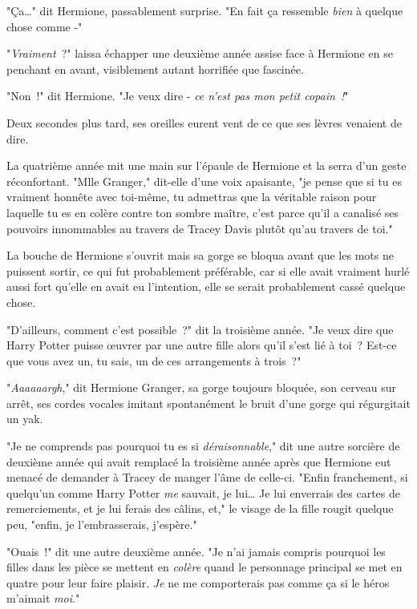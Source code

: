 "Ça…" dit Hermione, passablement surprise. "En fait ça ressemble \emph{bien} à quelque chose comme -"

"\emph{Vraiment}~?" laissa échapper une deuxième année assise face à Hermione en se penchant en avant, visiblement autant horrifiée que fascinée.

"Non~!" dit Hermione. "Je veux dire - \emph{ce n'est pas mon petit copain~!}"

Deux secondes plus tard, ses oreilles eurent vent de ce que ses lèvres venaient de dire.

La quatrième année mit une main sur l'épaule de Hermione et la serra d'un geste réconfortant. "Mlle Granger," dit-elle d'une voix apaisante, "je pense que si tu es vraiment honnête avec toi-même, tu admettras que la véritable raison pour laquelle tu es en colère contre ton sombre maître, c'est parce qu'il a canalisé ses pouvoirs innommables au travers de Tracey Davis plutôt qu'au travers de toi."

La bouche de Hermione s'ouvrit mais sa gorge se bloqua avant que les mots ne puissent sortir, ce qui fut probablement préférable, car si elle avait vraiment hurlé aussi fort qu'elle en avait eu l'intention, elle se serait probablement cassé quelque chose.

"D'ailleurs, comment c'est possible~?" dit la troisième année. "Je veux dire que Harry Potter puisse œuvrer par une autre fille alors qu'il s'est lié à toi~? Est-ce que vous avez un, tu sais, un de ces arrangements à trois~?"

"\emph{Aaaaaargh}," dit Hermione Granger, sa gorge toujours bloquée, son cerveau sur arrêt, ses cordes vocales imitant spontanément le bruit d'une gorge qui régurgitait un yak.


"Je ne comprends pas pourquoi tu es si \emph{déraisonnable}," dit une autre sorcière de deuxième année qui avait remplacé la troisième année après que Hermione eut menacé de demander à Tracey de manger l'âme de celle-ci. "Enfin franchement, si quelqu'un comme Harry Potter \emph{me} sauvait, je lui… Je lui enverrais des cartes de remerciements, et je lui ferais des câlins, et," le visage de la fille rougit quelque peu, "enfin, je l'embrasserais, j'espère."

"Ouais~!" dit une autre deuxième année. "Je n'ai jamais compris pourquoi les filles dans les pièce se mettent en \emph{colère} quand le personnage principal se met en quatre pour leur faire plaisir. \emph{Je} ne me comporterais pas comme ça si le héros m'aimait \emph{moi}."

